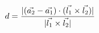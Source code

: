 \documentclass[preview]{standalone}
\begin{document}
\begin{align*}
\special{dvisvgm:raw <g id='unique000'>}d = \frac{|(\vec{a_2}-\vec{a_1}) \cdot (\vec{l_1} \times \vec{l_2})|}{|\vec{l_1} \times \vec{l_2}|}\special{dvisvgm:raw </g>}
\end{align*}
\end{document}
